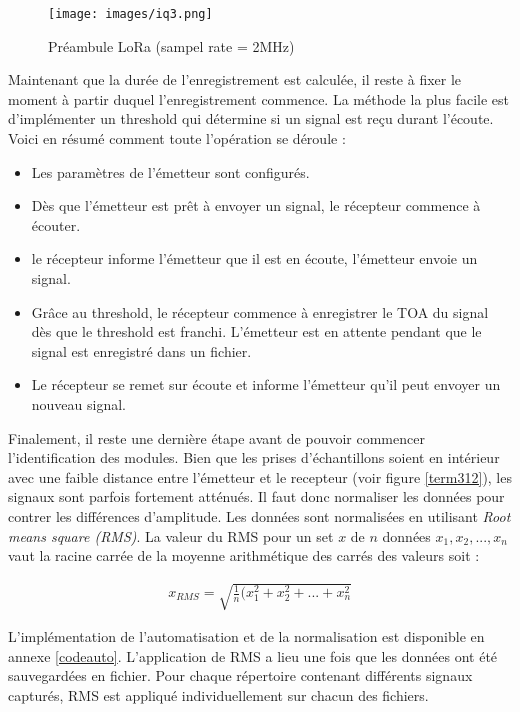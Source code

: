 \clearpage

\begin{figure}[h]
\centering

\texttt{[image: images/iq3.png]}
\caption{Préambule LoRa (sampel rate = 2MHz)}\label{term311}
\end{figure}

Maintenant que la durée de l'enregistrement est calculée, il reste à fixer le moment à partir duquel l'enregistrement commence. La méthode la plus facile est d'implémenter un threshold qui détermine si un signal est reçu durant l'écoute. Voici en résumé comment toute l'opération se déroule :

\begin{itemize}
\item Les paramètres de l'émetteur sont configurés. 
\item Dès que l'émetteur est prêt à envoyer un signal, le récepteur commence à écouter.
\item le récepteur informe l'émetteur que il est en écoute, l'émetteur envoie un signal.
\item Grâce au threshold, le récepteur commence à enregistrer le TOA du signal dès que le threshold est franchi. L'émetteur est en attente pendant que le signal est enregistré dans un fichier.
\item Le récepteur se remet sur écoute et informe l'émetteur qu'il peut envoyer un nouveau signal.
\end{itemize}

Finalement, il reste une dernière étape avant de pouvoir commencer l'identification des modules. Bien que les prises d'échantillons soient en intérieur avec une faible distance entre l'émetteur et le recepteur (voir figure \ref{term312}), les signaux sont parfois fortement atténués. Il faut donc normaliser les données pour contrer les différences d'amplitude. Les données sont normalisées en utilisant \textit{Root means square (RMS)}. La valeur du RMS pour un set $x$ de $n$ données ${x_1,x_2,...,x_n}$ vaut la racine carrée de la moyenne arithmétique des carrés des valeurs soit :

\begin{align}
    x_{RMS} = \sqrt{\frac{1}{n}(x_1^2 + x_2^2 + ... + x_n^2}
\end{align}

L'implémentation de l'automatisation et de la normalisation est disponible en annexe \ref{codeauto}. L'application de RMS a lieu une fois que les données ont été sauvegardées en fichier. Pour chaque répertoire contenant différents signaux capturés, RMS est appliqué individuellement sur chacun des fichiers.

